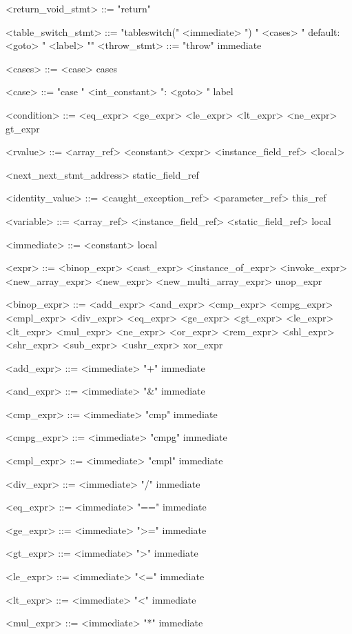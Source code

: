 \documentclass{report}
\begin{document}
\begin{grammar}
<return_void_stmt> ::= "return" 

<table_switch_stmt> ::= "tableswitch(" <immediate> ") {" <cases> " default: <goto> " <label> "}" <throw_stmt> ::= "throw" immediate

<cases> ::= <case> cases

<case> ::= "case " <int_constant> ": <goto> " label

<condition> ::= <eq_expr> \alt <ge_expr> \alt <le_expr> \alt <lt_expr> \alt <ne_expr> \alt gt_expr

<rvalue> ::= <array_ref> \alt <constant> \alt <expr> \alt <instance_field_ref> \alt <local> 

<next_next_stmt_address> \alt static_field_ref

<identity_value> ::= <caught_exception_ref> \alt <parameter_ref> \alt this_ref

<variable> ::= <array_ref> \alt <instance_field_ref> \alt <static_field_ref> \alt local

<immediate> ::= <constant> \alt local

<expr> ::= <binop_expr> \alt <cast_expr> \alt <instance_of_expr> \alt <invoke_expr> \alt <new_array_expr> \alt <new_expr> \alt <new_multi_array_expr> \alt unop_expr

<binop_expr> ::= <add_expr> \alt <and_expr> \alt <cmp_expr> \alt <cmpg_expr> \alt <cmpl_expr> \alt <div_expr> \alt <eq_expr> \alt <ge_expr> \alt <gt_expr> \alt <le_expr> \alt <lt_expr> \alt <mul_expr> \alt <ne_expr> \alt <or_expr> \alt <rem_expr> \alt <shl_expr> \alt <shr_expr> \alt <sub_expr> \alt <ushr_expr> \alt xor_expr

<add_expr> ::= <immediate> "+" immediate

<and_expr> ::= <immediate> "&" immediate

<cmp_expr> ::= <immediate> "cmp" immediate

<cmpg_expr> ::= <immediate> "cmpg" immediate

<cmpl_expr> ::= <immediate> "cmpl" immediate

<div_expr> ::= <immediate> "/" immediate

<eq_expr> ::= <immediate> "==" immediate

<ge_expr> ::= <immediate> ">=" immediate

<gt_expr> ::= <immediate> ">" immediate

<le_expr> ::= <immediate> "<=" immediate

<lt_expr> ::= <immediate> "<" immediate

<mul_expr> ::= <immediate> "*" immediate


\end{grammar}
\end{document}
